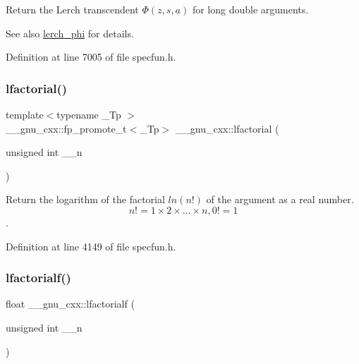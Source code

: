 Return the Lerch transcendent $ \Phi(z,s,a) $ for {\ttfamily  long double } arguments.

\begin{DoxySeeAlso}{See also}
\hyperlink{group__gnu__math__spec__func_ga31d7cfc601a99d72e58f654d0c890fd6}{lerch\+\_\+phi} for details. 
\end{DoxySeeAlso}


Definition at line 7005 of file specfun.\+h.

\mbox{\label{group__gnu__math__spec__func_gab256f8d7b77b9a8fefafca21827166eb}} 
\subsubsection{\texorpdfstring{lfactorial()}{lfactorial()}}
{\footnotesize\ttfamily template$<$typename \+\_\+\+Tp $>$ \\
\+\_\+\+\_\+gnu\+\_\+cxx\+::fp\+\_\+promote\+\_\+t$<$\+\_\+\+Tp$>$ \+\_\+\+\_\+gnu\+\_\+cxx\+::lfactorial (\begin{DoxyParamCaption}\item[{unsigned int}]{\+\_\+\+\_\+n }\end{DoxyParamCaption})\hspace{0.3cm}{\ttfamily [inline]}}



Return the logarithm of the factorial $ ln(n!) $ of the argument as a real number. \[ n! = 1 \times 2 \times ... \times n, 0! = 1 \]. 



Definition at line 4149 of file specfun.\+h.

\mbox{\label{group__gnu__math__spec__func_ga65af05c4093d4895a564a8d67e389a9b}} 
\subsubsection{\texorpdfstring{lfactorialf()}{lfactorialf()}}
{\footnotesize\ttfamily float \+\_\+\+\_\+gnu\+\_\+cxx\+::lfactorialf (\begin{DoxyParamCaption}\item[{unsigned int}]{\+\_\+\+\_\+n }\end{DoxyParamCaption})\hspace{0.3cm}{\ttfamily [inline]}}

